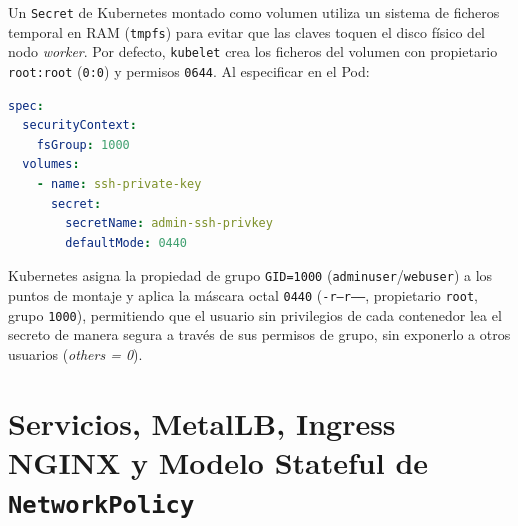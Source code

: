 Un \texttt{Secret} de Kubernetes montado como volumen utiliza un sistema de ficheros temporal en RAM (\texttt{tmpfs}) para evitar que las claves toquen el disco físico del nodo \textit{worker}. Por defecto, \texttt{kubelet} crea los ficheros del volumen con propietario \texttt{root:root} (\texttt{0:0}) y permisos \texttt{0644}. Al especificar en el Pod:
\begin{lstlisting}[language=YAML]
spec:
  securityContext:
    fsGroup: 1000
  volumes:
    - name: ssh-private-key
      secret:
        secretName: admin-ssh-privkey
        defaultMode: 0440
\end{lstlisting}
Kubernetes asigna la propiedad de grupo \texttt{GID=1000} (\texttt{adminuser}/\texttt{webuser}) a los puntos de montaje y aplica la máscara octal \texttt{0440} (\texttt{-r--r-----}, propietario \texttt{root}, grupo \texttt{1000}), permitiendo que el usuario sin privilegios de cada contenedor lea el secreto de manera segura a través de sus permisos de grupo, sin exponerlo a otros usuarios (\textit{others = 0}).

\section{Servicios, MetalLB, Ingress NGINX y Modelo Stateful de \texttt{NetworkPolicy}}

